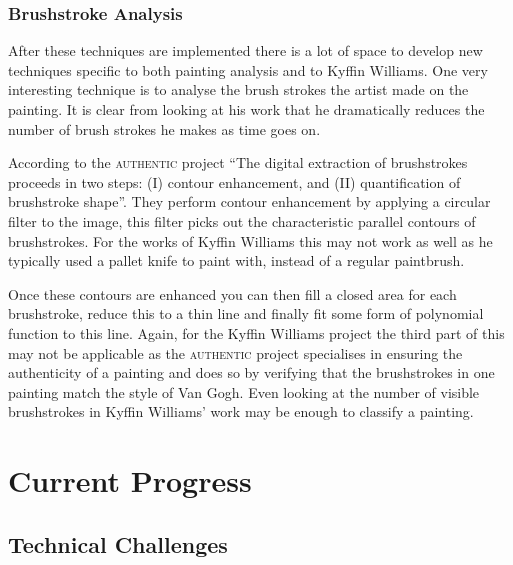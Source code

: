 \documentclass[11pt,fleqn,twoside]{article}
\begin{document}
\subsubsection{Brushstroke Analysis}
After these techniques are implemented there is a lot of space to develop new techniques specific 
to both painting analysis and to Kyffin Williams. One very interesting technique is to analyse the
brush strokes the artist made on the painting. It is clear from looking at his work that he 
dramatically reduces the number of brush strokes he makes as time goes on. 

According to the \textsc{authentic} project ``The digital extraction of brushstrokes proceeds in 
two steps: (I) contour enhancement, and (II) quantification of brushstroke 
shape''\cite{citeulike:11446581}. They perform contour enhancement by applying a circular filter to
the image, this filter picks out the characteristic parallel contours of brushstrokes. For the 
works of Kyffin Williams this may not work as well as he typically used a pallet knife %
to paint with, instead of a regular paintbrush.

Once these contours are enhanced you can then fill a closed area for each brushstroke, reduce this 
to a thin line and finally fit some form of polynomial function to this line. Again, for the Kyffin
Williams project the third part of this may not be applicable as the \textsc{authentic} project
specialises in ensuring the authenticity of a painting and does so by verifying that the 
brushstrokes in one painting match the style of Van Gogh. Even looking at the number of visible
brushstrokes in Kyffin Williams' work may be enough to classify a painting.



\section{Current Progress}

\subsection{Technical Challenges}
\end{document}
